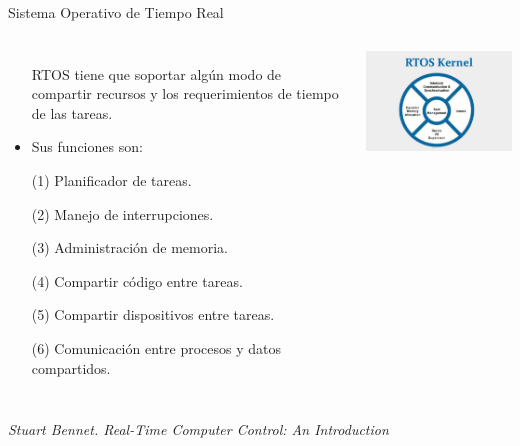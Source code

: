 \documentclass[8pt,aspectratio=169,compress]{beamer}
\begin{document}
\begin{frame}{Sistema Operativo de Tiempo Real}

   \begin{columns}[onlytextwidth,T]
     \column{\dimexpr\linewidth-50mm-5mm}

\begin{itemize}
  \item[RTOS] tiene que soportar algún modo de compartir recursos y los requerimientos de tiempo de las tareas. 

\item Sus funciones son:

\bigskip
(1) Planificador de tareas.

\bigskip
(2) Manejo de interrupciones.

\bigskip
(3) Administración de memoria.

\bigskip
(4) Compartir código entre tareas.

\bigskip
(5) Compartir dispositivos entre tareas.

\bigskip
(6) Comunicación entre procesos y datos compartidos.

\bigskip
\bigskip
\end{itemize}
      \column{70mm}
    \includegraphics[width=80mm]{images/rtos.jpg}

    \end{columns}

\textit{Stuart Bennet. Real-Time Computer Control: An Introduction}
\end{frame}
\end{document}

